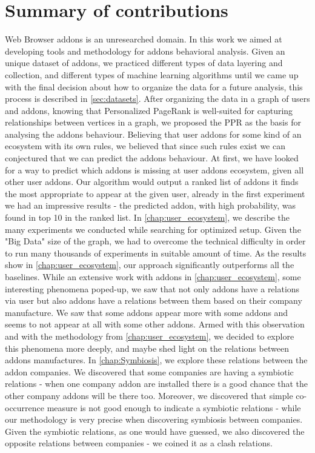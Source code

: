 \documentclass[11pt,oneside]{book}
\begin{document}
\chapter{Summary of contributions}
\label{chap:summary}
Web Browser addons is an unresearched domain. In this work we aimed at developing tools and methodology for addons behavioral analysis.
Given an unique dataset of addons, we practiced different types of data layering and collection, and different types of machine learning algorithms until we came up with the final decision about how to organize the data for a future analysis, this process is described in \autoref{sec:datasets}.
After organizing the data in a graph of users and addons, knowing that Personalized PageRank is well-suited for capturing relationships between vertices in a graph, we proposed the PPR as the basis for analysing the addons behaviour.
Believing that user addons for some kind of an ecosystem with its own rules, we believed that since such rules exist we can conjectured that we can predict the addons behaviour.
At first, we have looked for a way to predict which addons is missing at user addons ecosystem, given all other user addons.
Our algorithm would output a ranked list of addons it finds the most appropriate to appear at the given user, already in the first experiment we had an impressive results - the predicted addon, with high probability, was found in top 10 in the ranked list. In \autoref{chap:user_ecosystem}, we describe the many experiments we conducted while searching for optimized setup. Given the "Big Data" size of the graph, we had to overcome the technical difficulty in order to run many thousands of experiments in suitable amount of time.
As the results show in \autoref{chap:user_ecosystem}, our approach significantly outperforms all the baselines.
While an extensive work with addons in \autoref{chap:user_ecosystem}, some interesting phenomena poped-up, we saw that not only addons have a relations via user but also addons have a relations between them based on their company manufacture. We saw that some addons appear more with some addons and seems to not appear at all with some other addons.
Armed with this observation and with the methodology from \autoref{chap:user_ecosystem}, we decided to explore this phenomena more deeply, and maybe shed light on the relations between addons manufactures.
In \autoref{chap:Symbiosis}, we explore these relations between the addon companies.
We discovered that some companies are having a symbiotic relations - when one company addon are installed there is a good chance that the other company addons will be there too. Moreover, we discovered that simple co-occurrence measure is not good enough to indicate a symbiotic relations - while our methodology is very precise when discovering symbiosis between companies. Given the symbiotic relations, as one would have guessed, we also discovered the opposite relations between companies - we coined it as a clash relations.
\end{document}
